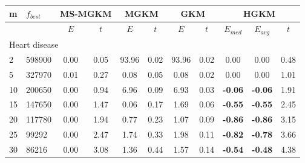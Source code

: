 {\footnotesize
\centering
\begin{longtable}{@{}llccccccccc@{}}
\hline
\multicolumn{1}{l|}{m}  & \multicolumn{1}{l|}{$f_{best}$} & \multicolumn{2}{c|}{MS-MGKM}      & \multicolumn{2}{c|}{MGKM}         & \multicolumn{2}{c|}{GKM}          & \multicolumn{3}{c}{HGKM}                \\ \hline
                        & \multicolumn{1}{l|}{}           & $E$  & \multicolumn{1}{c|}{$t$}   & $E$   & \multicolumn{1}{c|}{$t$}  & $E$   & \multicolumn{1}{c|}{$t$}  & $E_{med}$      & $E_{avg}$      & $t$   \\ \hline
\multicolumn{11}{l}{Heart disease}                                                                                                                                                                              \\ \hline
\multicolumn{1}{l|}{2}  & \multicolumn{1}{l|}{598900}     & 0.00 & \multicolumn{1}{c|}{0.05}  & 93.96 & \multicolumn{1}{c|}{0.02} & 93.96 & \multicolumn{1}{c|}{0.02} & 0.00           & 0.00           & 0.48  \\
\multicolumn{1}{l|}{5}  & \multicolumn{1}{l|}{327970}     & 0.01 & \multicolumn{1}{c|}{0.27}  & 0.08  & \multicolumn{1}{c|}{0.05} & 0.08  & \multicolumn{1}{c|}{0.02} & 0.00           & 0.00           & 1.01  \\
\multicolumn{1}{l|}{10} & \multicolumn{1}{l|}{200650}     & 0.00 & \multicolumn{1}{c|}{0.94}  & 6.96  & \multicolumn{1}{c|}{0.09} & 6.93  & \multicolumn{1}{c|}{0.03} & \textbf{-0.06} & \textbf{-0.06} & 1.91  \\
\multicolumn{1}{l|}{15} & \multicolumn{1}{l|}{147650}     & 0.00 & \multicolumn{1}{c|}{1.47}  & 0.06  & \multicolumn{1}{c|}{0.17} & 1.69  & \multicolumn{1}{c|}{0.06} & \textbf{-0.55} & \textbf{-0.55} & 2.45  \\
\multicolumn{1}{l|}{20} & \multicolumn{1}{l|}{117780}     & 0.00 & \multicolumn{1}{c|}{1.94}  & 0.77  & \multicolumn{1}{c|}{0.23} & 1.07  & \multicolumn{1}{c|}{0.09} & \textbf{-0.86} & \textbf{-0.86} & 3.15  \\
\multicolumn{1}{l|}{25} & \multicolumn{1}{l|}{99292}      & 0.00 & \multicolumn{1}{c|}{2.47}  & 1.74  & \multicolumn{1}{c|}{0.33} & 1.98  & \multicolumn{1}{c|}{0.11} & \textbf{-0.82} & \textbf{-0.78} & 3.66  \\
\multicolumn{1}{l|}{30} & \multicolumn{1}{l|}{86216}      & 0.00 & \multicolumn{1}{c|}{3.08}  & 1.36  & \multicolumn{1}{c|}{0.44} & 1.57  & \multicolumn{1}{c|}{0.14} & \textbf{-0.54} & \textbf{-0.48} & 4.38  \\

\end{longtable}}
